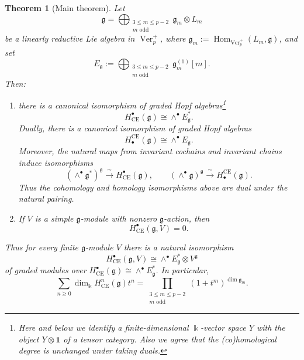 \documentclass[12pt]{amsart}
\newtheorem{theorem}{Theorem}[section]
\theoremstyle{remark}
\DeclareMathOperator{\Ver}{Ver}
\DeclareMathOperator{\Hom}{Hom}
\newcommand{\kk}{\Bbbk}
\newcommand{\g}{\mathfrak g}
\newcommand{\one}{\mathbf 1}
\newcommand{\CE}{\mathrm{CE}}
\begin{document}
\begin{theorem}[Main theorem]\label{thm:main-intro}
Let
\[
 \g=\bigoplus_{\substack{3\leq m\leq p-2\\m\text{ odd}}}
 \g_m\otimes L_m
\]
be a linearly reductive Lie algebra in $\Ver_p^+$, where
$\g_m:=\Hom_{\Ver_p^+}(L_m,\g)$, and set
\[
 E_{\g}:=
 \bigoplus_{\substack{3\leq m\leq p-2\\m\text{ odd}}}
 \g_m^{(1)}[m].
\]
Then:
\begin{enumerate}[label=\textup{(\roman*)},leftmargin=2.3em]
\item there is a canonical isomorphism of graded Hopf algebras\footnote{Here and below we identify a finite-dimensional $\kk$-vector space $Y$ 
 with the object $Y\otimes \one$ of a tensor category. Also we agree that the (co)homological degree is unchanged under taking duals.}
\[
 H^\bullet_{\CE}(\g)\cong\wedge^\bullet E_{\g}^*.
\]
Dually, there is a canonical isomorphism of graded Hopf algebras
\[
 H_\bullet^{\CE}(\g)\cong\wedge^\bullet E_\g.
\]
Moreover, the natural maps from invariant cochains and invariant chains induce
isomorphisms
\[
 (\wedge^\bullet\g^*)^\g\xrightarrow{\ \sim\ }H^\bullet_{\CE}(\g),
 \qquad
 (\wedge^\bullet\g)^\g\xrightarrow{\ \sim\ }H_\bullet^{\CE}(\g).
\]
Thus the cohomology and homology isomorphisms above are dual under the natural
pairing.

\item If $V$ is a simple $\g$-module with nonzero $\g$-action, then
\[
 H^\bullet_{\CE}(\g,V)=0.
\]
\end{enumerate}
Thus for every finite $\g$-module $V$ there is a natural
isomorphism
\[
 H^\bullet_{\CE}(\g,V)
 \cong \wedge^\bullet E_{\g}^*\otimes V^{\g}
\]
of graded modules over $H^\bullet_{\CE}(\g)\cong \wedge^\bullet E_\g^*$.  In particular,
\[
 \sum_{n\geq0}\dim_{\kk}H^n_{\CE}(\g)t^n
 =\prod_{\substack{3\leq m\leq p-2\\m\text{ odd}}}
 (1+t^m)^{\dim\g_m}.
\]
\end{theorem}
\end{document}

